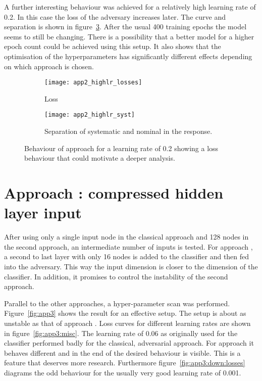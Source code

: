 A further interesting behaviour was achieved for a relatively high learning rate of \num{0.2}. In this case the loss of the adversary increases later. The curve and separation is shown in figure~\ref{fig:app2:highlr}. After the usual 400 training epochs the model seems to still be changing. There is a possibility that a better model for a higher epoch count could be achieved using this setup. It also shows that the optimisation of the hyperparameters has significantly different effects depending on which approach is chosen.

\begin{figure}[htbp]
    \centering
    \begin{subfigure}[b]{0.45\textwidth}
        \texttt{[image: app2\_highlr\_losses]}
        \caption{Loss}
        \label{fig:app2:highlr:losses}
    \end{subfigure}
\quad
    \begin{subfigure}[b]{0.45\textwidth}
        \texttt{[image: app2\_highlr\_syst]}
        \caption{Separation of systematic and nominal in the response.}
        \label{fig:app2:highlr:syst}
    \end{subfigure}
    \caption[ANN approach , high learning rate]{Behaviour of approach  for a learning rate of \num{0.2} showing a loss behaviour that could motivate a deeper analysis.}
	\label{fig:app2:highlr}
\end{figure}

\section{Approach : compressed hidden layer input}

After using only a single input node in the classical approach and \num{128} nodes in the second approach, an intermediate number of inputs is tested. For approach , a second to last layer with only \num{16} nodes is added to the classifier and then fed into the adversary. This way the input dimension is closer to the dimension of the classifier. In addition, it promises to control the instability of the second approach.

Parallel to the other approaches, a hyper-parameter scan was performed.
Figure~\ref{fig:app3} shows the result for an effective setup. The setup is about as unstable as that of approach . Loss curves for different learning rates are shown in figure~\ref{fig:app3:misc}. The learning rate of \num{0.06} as originally used for the classifier performed badly for the classical, adversarial approach. For approach  it behaves different and in the end of the desired behaviour is visible. This is a feature that deserves more research. Furthermore figure~\ref{fig:app3:down:losses} diagrams the odd behaviour for the usually very good learning rate of \num{0.001}. 

